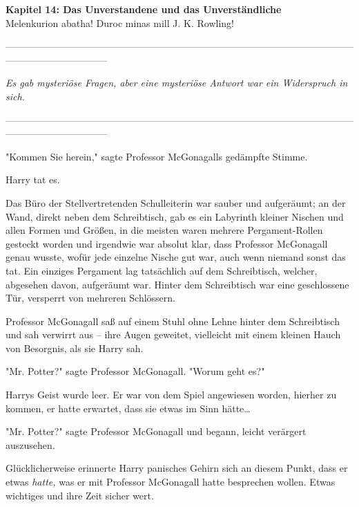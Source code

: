 

\hypertarget{das-unverstandene-und-das-unverstuxe4ndliche}{%

\textbf{Kapitel 14: Das Unverstandene und das Unverständliche}\\

Melenkurion abatha! Duroc minas mill J. K. Rowling!

--------------------------------------------------------------------------------------------------------------------------------------------

\emph{Es gab mysteriöse Fragen, aber eine mysteriöse Antwort war ein Widerspruch in sich.}

--------------------------------------------------------------------------------------------------------------------------------------------

"Kommen Sie herein," sagte Professor McGonagalls gedämpfte Stimme.

Harry tat es.

Das Büro der Stellvertretenden Schulleiterin war sauber und aufgeräumt; an der Wand, direkt neben dem Schreibtisch, gab es ein Labyrinth kleiner Nischen und allen Formen und Größen, in die meisten waren mehrere Pergament-Rollen gesteckt worden und irgendwie war absolut klar, dass Professor McGonagall genau wusste, wofür jede einzelne Nische gut war, auch wenn niemand sonst das tat. Ein einziges Pergament lag tatsächlich auf dem Schreibtisch, welcher, abgesehen davon, aufgeräumt war. Hinter dem Schreibtisch war eine geschlossene Tür, versperrt von mehreren Schlössern.

Professor McGonagall saß auf einem Stuhl ohne Lehne hinter dem Schreibtisch und sah verwirrt aus -- ihre Augen geweitet, vielleicht mit einem kleinen Hauch von Besorgnis, als sie Harry sah.

"Mr. Potter?" sagte Professor McGonagall. "Worum geht es?"

Harrys Geist wurde leer. Er war von dem Spiel angewiesen worden, hierher zu kommen, er hatte erwartet, dass sie etwas im Sinn hätte…

"Mr. Potter?" sagte Professor McGonagall und begann, leicht verärgert auszusehen.

Glücklicherweise erinnerte Harry panisches Gehirn sich an diesem Punkt, dass er etwas \emph{hatte,} was er mit Professor McGonagall hatte besprechen wollen. Etwas wichtiges und ihre Zeit sicher wert.

}
